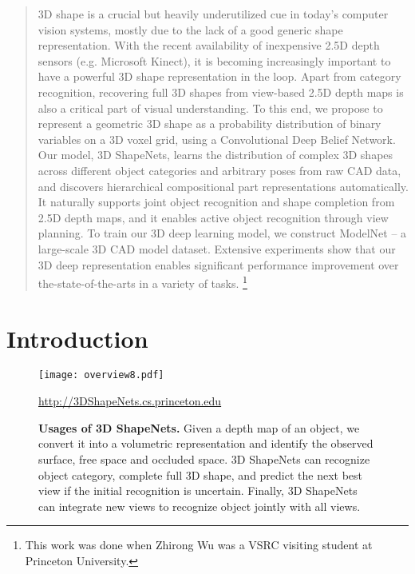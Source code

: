 \documentclass[10pt,twocolumn,letterpaper]{article}
\newcommand\blfootnote[1]{\begingroup
  \renewcommand\thefootnote{}\footnote{#1}\addtocounter{footnote}{-1}\endgroup
}
\begin{document}
\begin{abstract}
3D shape is a crucial but heavily underutilized cue in today's computer vision systems,
mostly due to the lack of a good generic shape representation.
With the recent availability of inexpensive 2.5D depth sensors (e.g. Microsoft Kinect),
it is becoming increasingly important to have a powerful 3D shape representation in the loop.
Apart from category recognition, recovering full 3D shapes from view-based 2.5D depth maps is also a critical part of visual understanding. To this end, we propose to represent a geometric 3D shape as a probability distribution of binary variables on a 3D voxel grid, using a Convolutional Deep Belief Network. 
Our model, 3D ShapeNets, learns the distribution of complex 3D shapes across different object categories and arbitrary poses from raw CAD data,
and discovers hierarchical compositional part representations automatically. 
It naturally supports joint object recognition and shape completion from 2.5D depth maps, and it enables active object recognition through view planning.
To train our 3D deep learning model, 
we construct ModelNet -- a large-scale 3D CAD model dataset.
Extensive experiments show that our 3D deep representation enables significant performance improvement over the-state-of-the-arts in a variety of tasks.
\blfootnote{This work was done when Zhirong Wu was a VSRC visiting student at Princeton University.}
\end{abstract}


\section{Introduction}

\begin{figure}[t]
\centering

\texttt{[image: overview8.pdf]}

\normalsize\href{http://3DShapeNets.cs.princeton.edu}{http://3DShapeNets.cs.princeton.edu}

\vspace{-1mm}
\caption{{\bf Usages of 3D ShapeNets.}
Given a depth map of an object, we convert it into a volumetric representation and identify the observed surface, free space and occluded space. 
3D ShapeNets can recognize object category, complete full 3D shape, 
and predict the next best view if the initial recognition is uncertain. 
Finally, 3D ShapeNets can integrate new views to recognize object jointly with all views.
}

\label{fig:teaser}
\end{figure}
\end{document}
